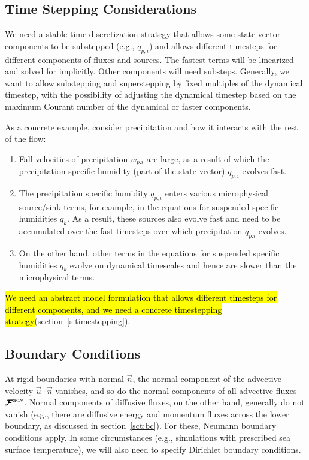 \documentclass{article}
\begin{document}
\subsection{Time Stepping Considerations}

We need a stable time discretization strategy that allows some state vector components to be substepped (e.g., $q_{p,i}$) and allows different timesteps for different components of fluxes and sources. The fastest terms will be linearized and solved for implicitly. Other components will need substeps. Generally, we want to allow substepping and superstepping by fixed multiples of the dynamical timestep, with the possibility of adjusting the dynamical timestep based on the maximum Courant number of the dynamical or faster components. 

As a concrete example, consider precipitation and how it interacts with the rest of the flow:
\begin{enumerate}
\item Fall velocities of precipitation $w_{p. i}$ are large, as a result of which the precipitation specific humidity (part of the state vector) $q_{p,i}$ evolves fast.
\item The precipitation specific humidity $q_{p,i}$ enters various microphysical source/sink terms, for example, in the equations for suspended specific humidities $q_k$. As a result, these sources also evolve fast and need to be accumulated over the fast timesteps over which precipitation $q_{p.i}$ evolves.
\item On the other hand, other terms in the equations for suspended specific humidities $q_k$ evolve on dynamical timescales and hence are slower than the microphysical terms.
\end{enumerate}
\hl{We need an abstract model formulation that allows different timesteps for different components, and we need a concrete timestepping strategy}(section~\ref{s:timestepping}).

\subsection{Boundary Conditions}

At rigid boundaries with normal $\vec{n}$, the normal component of the advective velocity $\vec{u} \cdot \vec{n}$ vanishes, and so do the normal components of all advective fluxes $\boldsymbol{{\mathcal{F}}}^{\mathrm{adv}}$. Normal components of diffusive fluxes, on the other hand, generally do not vanish (e.g., there are diffusive energy and momentum fluxes across the lower boundary, as discussed in section~\ref{sct:bc}). For these, Neumann boundary conditions apply. In some circumstances (e.g., simulations with prescribed sea surface temperature), we will also need to specify Dirichlet boundary conditions. 
\end{document}
